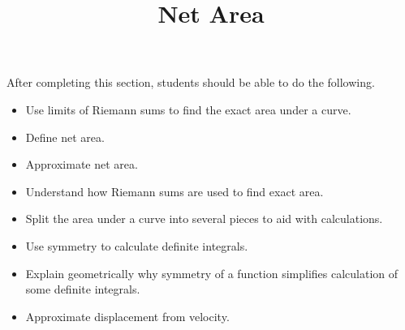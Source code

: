 \documentclass{ximera}
\title{Net Area}
\begin{document}
\begin{abstract}
\end{abstract}

\maketitle

\begin{sectionOutcomes}

After completing this section, students should be able to do the following.

\begin{itemize}
	\item Use limits of Riemann sums to find the exact area under a curve.
	\item Define net area.
	\item Approximate net area.
	\item Understand how Riemann sums are used to find exact area.
	\item Split the area under a curve into several pieces to aid with calculations.
	\item Use symmetry to calculate definite integrals.
	\item Explain geometrically why symmetry of a function simplifies calculation of some definite integrals.
	\item Approximate displacement from velocity.
\end{itemize}

\end{sectionOutcomes}
\end{document}

